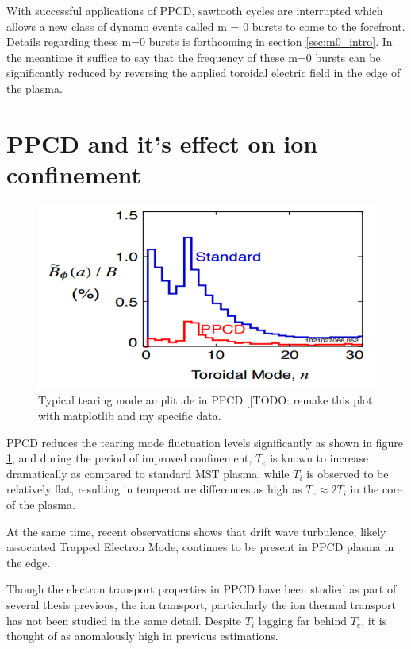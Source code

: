 \begin{refsection}
With successful applications of PPCD, sawtooth cycles are interrupted which allows a new class of dynamo events called m = 0 bursts to come to the forefront. Details regarding these m=0 bursts is forthcoming in section \ref{sec:m0_intro}. In the meantime it suffice to say that the frequency of these m=0 bursts can be significantly reduced by reversing the applied toroidal electric field in the edge of the plasma\cite{Chapman2001}.

\section{PPCD and it's effect on ion confinement} \label{sec:PPCD_characteristic}

\begin{figure}
    \centering
    \includegraphics{./1_Introduction/ppcd_fluc.png}
    \caption[Typical tearing mode amplitude in PPCD]{Typical tearing mode amplitude in PPCD [[TODO: remake this plot with matplotlib and my specific data.}
    \label{fig:ppcd_fluc}
\end{figure}

PPCD reduces the tearing mode fluctuation levels significantly as shown in
figure \ref{fig:ppcd_fluc}, and during the period of improved confinement, $T_e$ is known to increase dramatically as compared to standard MST plasma, while $T_i$ is observed to be relatively flat, resulting in temperature differences as high as $T_e \approx 2T_i$ in the core of the plasma. 


At the same time, recent observations shows that drift wave turbulence, likely associated Trapped Electron Mode, continues to be present in PPCD plasma in the edge. 

Though the electron transport properties in PPCD have been studied as part of several thesis previous, the ion transport, particularly the ion thermal transport has not been studied in the same detail. Despite $T_i$ lagging far behind $T_e$, it is thought of as anomalously high in previous estimations. 




\end{refsection}
